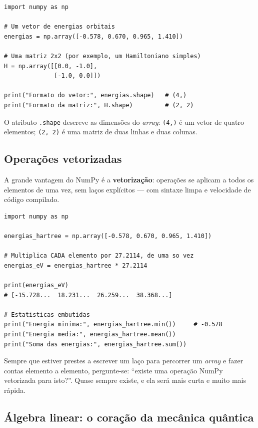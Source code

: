 \documentclass[11pt,a4paper,openany]{book}
\newcommand{\code}[1]{\texttt{#1}}
\newcommand{\numpy}{\textsf{NumPy}}
\begin{document}
\begin{lstlisting}[style=python,caption={Criando arrays com \numpy{}.},label={lst:nparray}]
import numpy as np

# Um vetor de energias orbitais
energias = np.array([-0.578, 0.670, 0.965, 1.410])

# Uma matriz 2x2 (por exemplo, um Hamiltoniano simples)
H = np.array([[0.0, -1.0],
              [-1.0, 0.0]])

print("Formato do vetor:", energias.shape)   # (4,)
print("Formato da matriz:", H.shape)         # (2, 2)
\end{lstlisting}

\noindent
O atributo \code{.shape} descreve as dimensões do \emph{array}: \code{(4,)} é um vetor
de quatro elementos; \code{(2, 2)} é uma matriz de duas linhas e duas colunas.

\subsection{Operações vetorizadas}

A grande vantagem do \numpy{} é a \textbf{vetorização}: operações se aplicam a todos
os elementos de uma vez, sem laços explícitos --- com sintaxe limpa e velocidade
de código compilado.

\begin{lstlisting}[style=python,caption={Vetorização: convertendo um vetor inteiro de unidades.}]
import numpy as np

energias_hartree = np.array([-0.578, 0.670, 0.965, 1.410])

# Multiplica CADA elemento por 27.2114, de uma so vez
energias_eV = energias_hartree * 27.2114

print(energias_eV)
# [-15.728...  18.231...  26.259...  38.368...]

# Estatisticas embutidas
print("Energia minima:", energias_hartree.min())     # -0.578
print("Energia media:", energias_hartree.mean())
print("Soma das energias:", energias_hartree.sum())
\end{lstlisting}

\begin{caixadica}
Sempre que estiver prestes a escrever um laço para percorrer um \emph{array} e
fazer contas elemento a elemento, pergunte-se: ``existe uma operação \numpy{}
vetorizada para isto?''. Quase sempre existe, e ela será mais curta e muito mais
rápida.
\end{caixadica}

\subsection{Álgebra linear: o coração da mecânica quântica}
\end{document}
